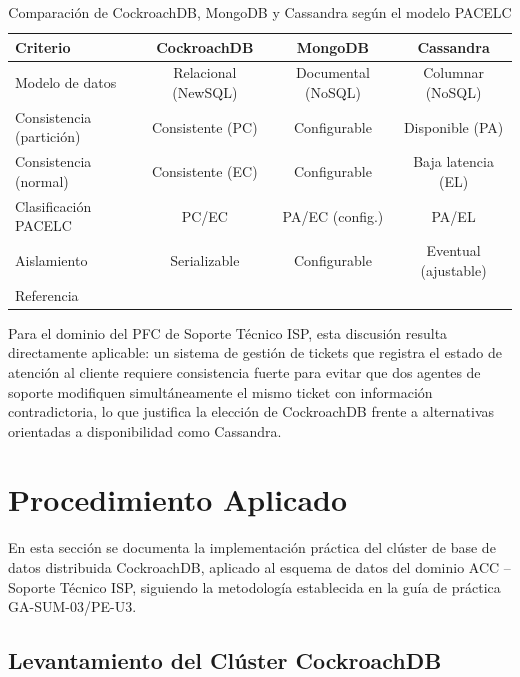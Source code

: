 \documentclass[12pt, a4paper]{article}
\begin{document}
\begin{table}[H]
\centering
\caption{Comparación de CockroachDB, MongoDB y Cassandra según el modelo PACELC}
\label{tab:pacelc-comparacion}
\small
\begin{tabular}{@{}lccc@{}}
\toprule
\textbf{Criterio} & \textbf{CockroachDB} & \textbf{MongoDB} & \textbf{Cassandra} \\
\midrule
Modelo de datos & Relacional (NewSQL) & Documental (NoSQL) & Columnar (NoSQL) \\
Consistencia (partición) & Consistente (PC) & Configurable & Disponible (PA) \\
Consistencia (normal) & Consistente (EC) & Configurable & Baja latencia (EL) \\
Clasificación PACELC & PC/EC & PA/EC (config.) & PA/EL \\
Aislamiento & Serializable & Configurable & Eventual (ajustable) \\
Referencia & \cite{taft2020cockroachdb} & \cite{samala2024mongodb} & \cite{lakshman2010cassandra} \\
\bottomrule
\end{tabular}
\end{table}

Para el dominio del PFC de Soporte Técnico ISP, esta discusión resulta directamente aplicable: un sistema de gestión de tickets que registra el estado de atención al cliente requiere consistencia fuerte para evitar que dos agentes de soporte modifiquen simultáneamente el mismo ticket con información contradictoria, lo que justifica la elección de CockroachDB frente a alternativas orientadas a disponibilidad como Cassandra.

\section{Procedimiento Aplicado}
\label{procedimiento}

En esta sección se documenta la implementación práctica del clúster de base de datos distribuida CockroachDB, aplicado al esquema de datos del dominio ACC -- Soporte Técnico ISP, siguiendo la metodología establecida en la guía de práctica GA-SUM-03/PE-U3.

\subsection{Levantamiento del Clúster CockroachDB}
\end{document}
